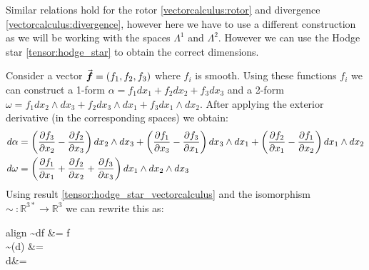 		Similar relations hold for the rotor \ref{vectorcalculus:rotor} and divergence \ref{vectorcalculus:divergence}, however here we have to use a different construction as we will be working with the spaces $\Lambda^1$ and $\Lambda^2$. However we can use the Hodge star \ref{tensor:hodge_star} to obtain the correct dimensions.
		
		Consider a vector $\vec{\boldsymbol{f}} = (f_1, f_2, f_3)$ where $f_i$ is smooth. Using these functions $f_i$ we can construct a 1-form $\alpha = f_1dx_1 + f_2dx_2 + f_3dx_3$ and a 2-form $\omega = f_1dx_2\wedge dx_3 + f_2dx_3\wedge dx_1 + f_3 dx_1\wedge dx_2$. After applying the exterior derivative (in the corresponding spaces) we obtain:
		\begin{align}
			d\alpha &= \left(\frac{\partial f_3}{\partial x_2} - \frac{\partial f_2}{\partial x_3}\right)dx_2\wedge dx_3 + \left(\frac{\partial f_1}{\partial x_3} - \frac{\partial f_3}{\partial x_1}\right)dx_3\wedge dx_1 + \left(\frac{\partial f_2}{\partial x_1} - \frac{\partial f_1}{\partial x_2}\right)dx_1\wedge dx_2 \nonumber\\
			d\omega &= \left(\frac{\partial f_1}{\partial x_1} + \frac{\partial f_2}{\partial x_2} + \frac{\partial f_3}{\partial x_3}\right)dx_1\wedge dx_2\wedge dx_3 \nonumber
		\end{align}
		Using result \ref{tensor:hodge_star_vectorcalculus} and the isomorphism $\sim\ :\mathbb{R}^{3*}\rightarrow\mathbb{R}^3$ we can rewrite this as:
		\begin{empheq}[box=\fbox]{align}
			\sim df &= \nabla f \\
			\sim (\ast d\alpha) &= \nabla\times{} \\
			\ast d\omega &= \nabla\cdot{}
		\end{empheq}
